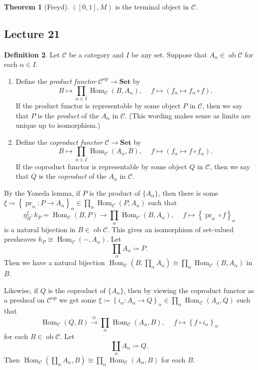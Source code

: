 \documentclass[10pt,letterpaper,cm]{nupset}
\theoremstyle{definition}
\newtheorem{definition}{Definition}[subsection]
\theoremstyle{theorem}
\newtheorem{theorem}[definition]{Theorem}
\theoremstyle{remark}
\newcommand{\1}{\mathbf{1}}
\renewcommand{\c}{\mathscr{C}}
\newcommand{\0}{\vec 0}
\DeclareMathOperator{\op}{op}
\DeclareMathOperator{\ob}{ob}
\DeclareMathOperator{\pr}{pr}
\DeclareMathOperator{\Hom}{Hom}
\begin{document}
\begin{theorem}[Freyd]
$\left([0,1], M\right)$ is the terminal object in $\c$.
\end{theorem}

\subsection{Lecture 21}

\begin{definition} Let $\c$ be a category and $I$ be any set. Suppose that $A_{\alpha} \in \ob \c$ for each $\alpha \in I$.
\begin{enumerate}
\item  Define the \textit{product functor} $\c^{\op} \to \mathbf{Set}$ by $$B \mapsto \prod_{\alpha \in I}\Hom_{\c}(B, A_{\alpha}), \  \quad f \mapsto \left(f_{\alpha} \mapsto f_{\alpha} \circ f\right).$$ If the product functor is representable by some object $P$ in $\c$, then we say that $P$ is the \textit{product} of the $A_{\alpha}$ in $\c$. (This wording makes sense as limits are unique up to isomorphism.)
\item Define the \textit{coproduct functor} $\c \to \mathbf{Set}$ by $$ B \mapsto \prod_{\alpha \in I} \Hom_{\c}(A_{\alpha}, B), \  \quad f \mapsto \left(f_{\alpha} \mapsto f \circ f_{\alpha}\right).$$ If the coproduct functor is representable by some object $Q$ in $\c$, then we say that $Q$ is the \textit{coproduct} of the $A_{\alpha}$ in $\c$.
\end{enumerate}
\end{definition}

 By the Yoneda lemma, if $P$ is the product of $\{A_{\alpha}\}$, then there is some $\xi \coloneqq \left\{\pr_{\alpha} : P \to A_{\alpha}\right\}_{\alpha} \in \prod_{\alpha}\Hom_{\c}(P, A_{\alpha})$ such that $$\eta^{\xi}_B : h_P = \Hom_{\c}(B, P) \to \prod_{\alpha}\Hom_{\c} (B, A_{\alpha}), \  \quad f \mapsto \left\{\pr_{\alpha} \circ f\right\}_{\alpha}$$ is a natural bijection in $B \in \ob \c$. This gives an isomorphism of set-valued presheaves $h_P \cong \Hom_{\c}(-, A_{\alpha})$. Let $$\prod_{\alpha} A_{\alpha} \coloneqq  P.$$ Then we have a natural bijection $\Hom_{\c}(B, \prod_{\alpha} A_{\alpha}) \cong \prod_{\alpha} \Hom_{\c}(B, A_{\alpha})$ in $B$.

 Likewise, if $Q$ is the coproduct of $\{A_{\alpha}\}$, then by viewing the coproduct functor as a presheaf on $\c^{\op}$ we get some $\xi\coloneqq  \left\{i_{\alpha} : A_{\alpha} \to Q\right\}_{\alpha} \in \prod_{\alpha}\Hom_{\c}(A_{\alpha}, Q)$ such that $$\Hom_{\c} (Q, B) \overset{\cong}{\longrightarrow} \prod_{\alpha}\Hom_{\c}(A_{\alpha}, B), \ \quad f \mapsto \left\{f \circ i_{\alpha}\right\}_{\alpha}$$ for each $B\in \ob \c$. Let $$\coprod_{\alpha} A_{\alpha} \coloneqq  Q.$$ Then $\Hom_{\c}\left(\coprod_{\alpha} A_{\alpha}, B\right) \cong \prod_{\alpha}\Hom_{\c}(A_{\alpha}, B)$ for each $B$.
 
\end{document}

